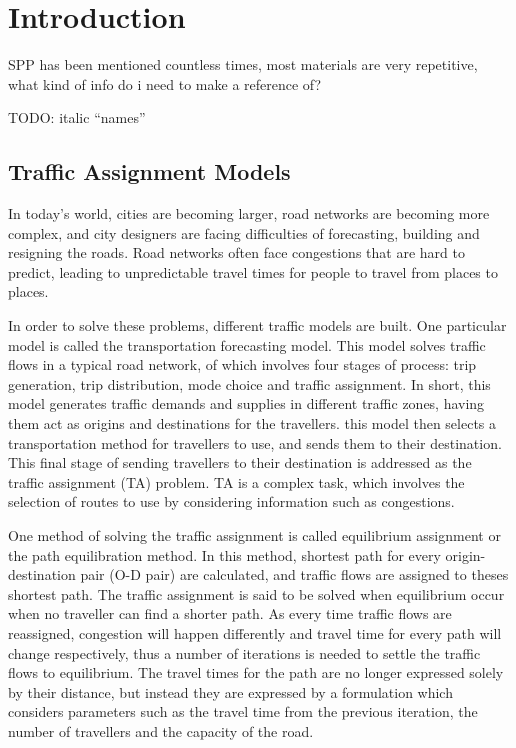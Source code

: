 \chapter{Introduction}
{
    SPP has been mentioned countless times,
    most materials are very repetitive,
    what kind of info do i need to make a reference of?

    TODO: italic ``names''
}
\section{Traffic Assignment Models}

In today's world, cities are becoming larger, 
road networks are becoming more complex,
and city designers are facing difficulties of 
forecasting, building and resigning the roads.
Road networks often face congestions that are hard to predict,
leading to unpredictable travel times for people to travel from places to places.

In order to solve these problems,
different traffic models are built.
One particular model is called the transportation forecasting model.
This model solves traffic flows in a typical road network,
of which involves four stages of process: trip generation,
trip distribution, mode choice and traffic assignment.
In short,
this model generates traffic demands and supplies in different traffic zones,
having them act as origins and destinations for the travellers.
this model then selects a transportation method for travellers
to use, and sends them to their destination.
This final stage of sending travellers to their destination is
addressed as the traffic assignment (TA) problem.
TA is a complex task,
which involves the selection of routes to use by considering information such as congestions.

One method of solving the traffic assignment is called 
equilibrium assignment or the path equilibration method.
In this method, 
shortest path for every origin-destination pair (O-D pair) are calculated, 
and traffic flows are assigned to theses shortest path.
The traffic assignment is said to be solved when equilibrium occur when no traveller can find a shorter path.
As every time traffic flows are reassigned,
congestion will happen differently and 
travel time for every path will change respectively,
thus a number of iterations is needed to settle the traffic flows
to equilibrium.
The travel times for the path are no longer expressed solely by their
distance,
but instead they are expressed by a formulation which considers
parameters such as the travel time from the previous iteration,
the number of travellers and the capacity of the road.

